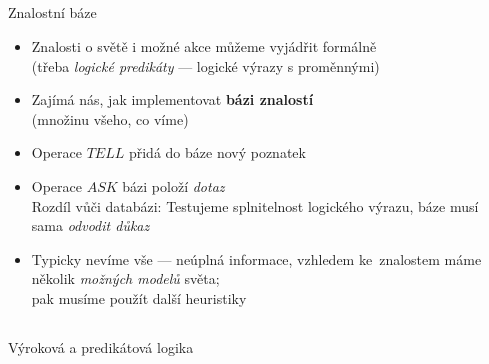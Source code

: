\documentclass{beamer}
\begin{document}
\subsection{}
\begin{frame}{Znalostní báze}
\begin{itemize}
\item Znalosti o světě i možné akce můžeme vyjádřit formálně \\ (třeba {\em logické predikáty} --- logické výrazy s proměnnými)
\item Zajímá nás, jak implementovat {\bf bázi znalostí} \\ (množinu všeho, co víme)
\item Operace $TELL$ přidá do báze nový poznatek
\item Operace $ASK$ bázi položí {\em dotaz} \\ Rozdíl vůči databázi: Testujeme splnitelnost logického výrazu, báze musí sama {\em odvodit důkaz}
\item Typicky nevíme vše --- neúplná informace, vzhledem ke~znalostem máme několik {\em možných modelů} světa; \\ pak musíme použít další heuristiky
\end{itemize}
\end{frame}

\subsection{}
\begin{frame}{Výroková a predikátová logika}
\end{frame}
\end{document}
